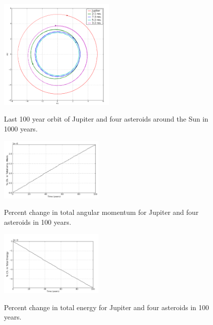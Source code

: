 \documentclass{article}%
\begin{document}
\begin{figure}[H]
	\centering
		\includegraphics[width=0.50\textwidth]{images/output1000yr.png}
	\label{fig:1000 year orbit}
	\caption{Last 100 year orbit of Jupiter and four asteroids around 
	         the Sun in 1000 years.}
\end{figure}

\begin{figure}[H]
	\centering
		\includegraphics[width=0.45\textwidth]{images/perMom5bodies100yr.png}
	\label{fig:Change in Momentum}
	\caption{Percent change in total angular momentum for Jupiter and four asteroids  
	         in 100 years.}
\end{figure}

\begin{figure}[H]
	\centering
		\includegraphics[width=0.45\textwidth]{images/perNrg5bodies100yr.png}
	\label{fig:Change in Energy}
	\caption{Percent change in total energy for Jupiter and four asteroids 
	         in 100 years.}
\end{figure}
\end{document}
